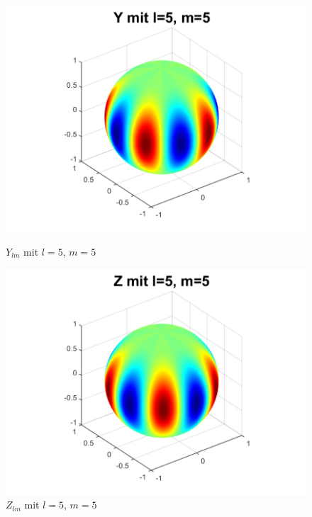 \begin{refsection}
\begin{figure}
\begin{minipage}[hbt]{0.4\textwidth}
\includegraphics[width=1\textwidth]{kugel/ylm/a_5_5.pdf}
\caption{$Y_{lm}$ mit $l=5$, $m=5$}
\label{skript:ylm l=5 m=5}
\end{minipage}
\hfill
\begin{minipage}[hbt]{0.4\textwidth}
\centering
\includegraphics[width=1\textwidth]{kugel/ylm/b_5_5.pdf}
\caption{$Z_{lm}$ mit $l=5$, $m=5$}
\label{skript:zlm l=5 m=5}
\end{minipage}
\end{figure}


\end{refsection}
